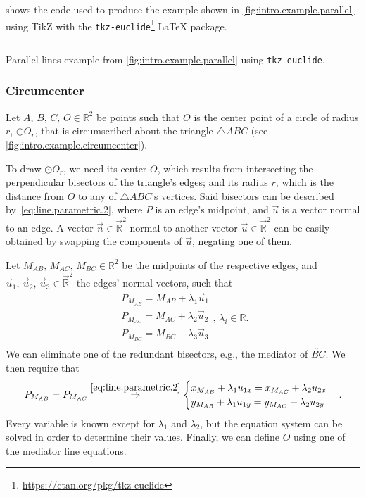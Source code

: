  shows the code used to produce the
example shown in \cref{fig:intro.example.parallel} using \acs{TikZ} with the
\texttt{tkz-euclide}\footnote{\url{https://ctan.org/pkg/tkz-euclide}} \LaTeX{}
package.

\begin{listing}[htb]
  \inputminted[highlightlines=3]{latex}{tikz/ex-parallel.tikz}
  \caption[Parallel lines example using \texttt{tkz-euclide}]{
    Parallel lines example from \cref{fig:intro.example.parallel} using
    \texttt{tkz-euclide}.}%
  \label{lst:intro.example.parallel.tikz}
\end{listing}

\subsubsection{Circumcenter}%
\label{sec:intro.examples.circumcenter}

Let $A,\, B,\, C,\, O \in \mathbb{R}^2$ be points such that $O$ is the center
point of a circle of radius $r$, $\odot O_r$, that is circumscribed about the
triangle $\triangle ABC$ (see \cref{fig:intro.example.circumcenter}).

To draw $\odot O_r$, we need its center $O$, which results from intersecting the
perpendicular bisectors of the triangle's edges; and its radius $r$, which is
the distance from $O$ to any of $\triangle ABC$'s vertices.  Said bisectors can
be described by~\cref{eq:line.parametric.2}, where $P$ is an edge's midpoint,
and $\vec{u}$ is a vector normal to an edge.  A vector $\vec{n} \in
\vec{\mathbb{R}}^2$ normal to another vector $\vec{u} \in \vec{\mathbb{R}}^2$
can be easily obtained by swapping the components of $\vec{u}$, negating one of
them.

Let $M_{AB},\, M_{AC},\, M_{BC} \in \mathbb{R}^2$ be the midpoints of the
respective edges, and $\vec{u}_1,\,\vec{u}_2,\,\vec{u}_3 \in \vec{\mathbb{R}}^2$
the edges' normal vectors, such that
\[
  \begin{split}
    P_{M_{AB}} = M_{AB} + \lambda_1 \vec{u}_1 \\
    P_{M_{AC}} = M_{AC} + \lambda_2 \vec{u}_2 \\
    P_{M_{BC}} = M_{BC} + \lambda_3 \vec{u}_3 \\
  \end{split},\,\lambda_i \in \mathbb{R}.
\]
We can eliminate one of the redundant bisectors, e.g., the mediator of
$\overleftrightarrow{BC}$.  We then require that
\[
  P_{M_{AB}} = P_{M_{AC}} \stackrel{\eqref{eq:line.parametric.2}}{\Rightarrow}
  \begin{cases}
    x_{M_{AB}} + \lambda_1 u_{1x} = x_{M_{AC}} + \lambda_2 u_{2x} \\
    y_{M_{AB}} + \lambda_1 u_{1y} = y_{M_{AC}} + \lambda_2 u_{2y} \\
  \end{cases}.
\]
Every variable is known except for $\lambda_1$ and $\lambda_2$, but the equation
system can be solved in order to determine their values.  Finally, we can define
$O$ using one of the mediator line equations.

